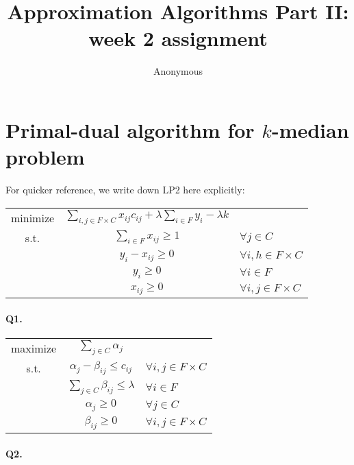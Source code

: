 \documentclass{article}
\begin{document}
\title{Approximation Algorithms Part II: week 2 assignment}
\author{Anonymous}

\maketitle

\newcommand{\abs}[1]{|#1|}
\newcommand{\cost}{\text{cost}}
\newcommand{\opt}{\text{OPT}\xspace}
\newcommand{\p}{\text{Prob}\xspace}

\section*{Primal-dual algorithm for $k$-median problem}

For quicker reference, we write down LP2 here explicitly:


\begin{tabular}{ccl}
  minimize  & $\sum_{i, j \in F\times C} x_{ij} c_{ij} + \lambda \sum_{i \in F} y_i - \lambda k$ & \\
  s.t.      & $\sum_{i \in F} x_{ij} \ge 1$ & $\forall j \in C$ \\
            & $y_i - x_{ij} \ge 0$ & $\forall i, h \in F\times C$ \\
            & $y_{i} \ge 0$ & $\forall i \in F$ \\
            & $x_{ij} \ge 0$ & $\forall i, j \in F\times C$
\end{tabular}

\paragraph{Q1. }

\begin{tabular}{ccl}
  maximize  & $\sum_{j \in C} \alpha_j$ & \\
  s.t.      & $\alpha_j - \beta_{ij} \le c_{ij}$ & $\forall i,j \in F\times C$ \\
            & $\sum_{j \in C} \beta_{ij} \le \lambda$ & $\forall i \in F$ \\
            & $\alpha_j \ge 0$ & $\forall j \in C$ \\
            & $\beta_{ij} \ge 0$ & $\forall i, j \in F\times C$
\end{tabular}

\paragraph{Q2. }
\end{document}
